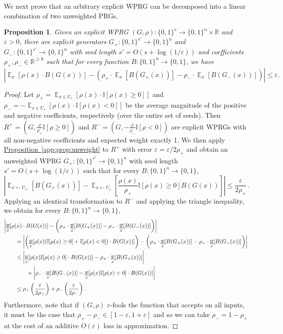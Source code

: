 \documentclass[11pt]{article}
\numberwithin{equation}{section}
\newtheorem{proposition}[theorem]{Proposition}
\theoremstyle{definition}
\theoremstyle{plain}
\newcommand{\R}{\mathbb R}
\newcommand{\expref}[2]{\hyperref[#2]{#1~\ref{#2}}}
\newcommand{\eps}{\varepsilon}
\newcommand{\zo}{\{0,1\}}
\newcommand{\la}{\leftarrow}
\newcommand{\ra}{\rightarrow}
\DeclareMathOperator*{\E}{\mathbb{E}}
\begin{document}
We next prove that an arbitrary explicit WPRG can be decomposed into a linear combination of two unweighted PRGs. %
\begin{proposition}
Given an explicit WPRG $(G,\rho) : \zo^s \ra \zo^n\times \R$ and $\eps>0$, there are 
explicit generators $G_+ : \zo^{s'}\rightarrow \zo^n$ and $G_- : \zo^{s'}\rightarrow \zo^n$ with seed length
$s'=O(s+\log(1/\eps))$ and coefficients $\rho_+,\rho_-\in \R^{\geq 0}$ such that for every function $B : \zo^n\rightarrow \zo$, we have %
\[\left|\E_x[\rho(x)\cdot B(G(x))] - \left( 
\rho_+\cdot \E_x\left[B(G_+(x))\right] - \rho_-\cdot \E_x\left[B(G_-(x))\right]\right)\right|\leq \eps.\]
\end{proposition}
\begin{proof}
Let $\rho_+=\E_{x\in U_s}[\rho(x)\cdot \mathbb{I}[\rho(x)\geq 0]]$ and $\rho_-=-\E_{x\in U_s}[\rho(x)\cdot \mathbb{I}[\rho(x)< 0]]$ be the average magnitude of the positive and negative coefficients,
%
respectively (over the entire set of seeds). Then $R^+=(G,\frac{\rho}{\rho_+}\mathbb{I}[\rho \geq 0])$ and $R^-=(G,-\frac{\rho}{\rho_-}\mathbb{I}[\rho< 0])$ are explicit WPRGs with all non-negative coefficients and expected weight exactly 1. We then apply \expref{Proposition}{app:prop:unweight} to $R^+$ with error $\eps=\eps/2\rho_+$ and obtain an unweighted WPRG $G_+:\zo^{s'}\ra\zo^n$ with seed length $s'=O(s+\log(1/\eps))$ such that for every $B:\zo^n\ra\zo$,
\[\left|\E_{x\la U_{s'}}[B(G_+(x))] - \E_{x\la U_{s}}\left[\frac{\rho(x)}{\rho_+}\mathbb{I}[\rho(x)\geq 0]B(G(x))\right]
\right|\leq \frac{\eps}{2\rho_+}\,.\] %
Applying an identical transformation to $R^-$ and applying the triangle inequality, we obtain for every $B:\zo^n\ra\zo$,
\begin{align*}
%
    \MoveEqLeft{\left|\E_x[\rho(x)\cdot B(G(x))] - \left(\rho_+ \cdot \E_x[B(G_+(x))]-\rho_-\cdot \E_x[B(G_-(x))]\right)\right|}\\ 
    &= \left|\left(\E_x[\rho(x)(\mathbb{I}[\rho(x)\geq 0]+\mathbb{I}[\rho(x)< 0])\cdot B(G(x))] \right)-\left( \rho_+ \cdot \E_x[B(G_+(x))]-\rho_-\cdot \E_x[B(G_-(x))] \right)\right|\\
    &\leq \left|\E_x[\rho(x)\mathbb{I}[\rho(x)\geq 0]\cdot B(G(x))]- \rho_+ \cdot \E_x[B(G_+(x))]\right| \\
%
%
    &\qquad +\left|\rho_-\cdot \E_x[B(G_-(x))]-\E_x[\rho(x)\mathbb{I}[\rho(x)< 0]\cdot B(G(x))]\right|\\
    &\leq \rho_+\left(\frac{\eps}{2\rho_+}\right)+\rho_-\left(\frac{\eps}{2\rho_-}\right)\,.
\end{align*}
%
Furthermore, note that if $(G,\rho)$ $\eps$-fools the function that accepts on all inputs, it must be the case that $\rho_+-\rho_-\in [1- \eps,1+\eps]$ and so we can take $\rho_-=1-\rho_+$ at the cost of an additive $O(\eps)$ loss in approximation.
\end{proof}
\end{document}
